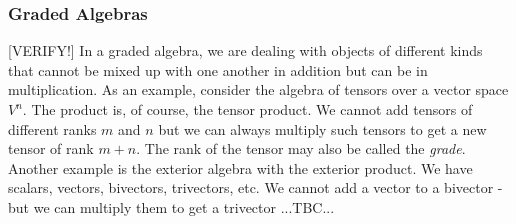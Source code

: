 





\subsubsection{Graded Algebras} [VERIFY!]
In a graded algebra, we are dealing with objects of different kinds that cannot be mixed up with one another in addition but can be in multiplication. As an example, consider the algebra of tensors over a vector space $V^n$. The product is, of course, the tensor product. We cannot add tensors of different ranks $m$ and $n$ but we can always multiply such tensors to get a new tensor of rank $m+n$. The rank of the tensor may also be called the \emph{grade}. Another example is the exterior algebra with the exterior product. We have scalars, vectors, bivectors, trivectors, etc. We cannot add a vector to a bivector - but we can multiply them to get a trivector ...TBC...







